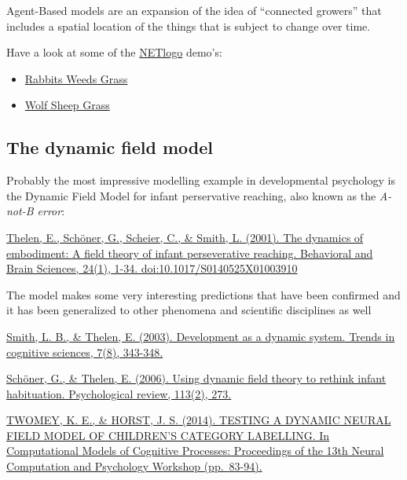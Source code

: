 \documentclass[12pt,]{book}
\providecommand{\tightlist}{%
  \setlength{\itemsep}{0pt}\setlength{\parskip}{0pt}}
\begin{document}
Agent-Based models are an expansion of the idea of ``connected growers'' that includes a spatial location of the things that is subject to change over time.

Have a look at some of the \href{http://ccl.northwestern.edu/netlogo/}{NETlogo} demo's:

\begin{itemize}
\tightlist
\item
  \href{http://www.netlogoweb.org/launch\#http://www.netlogoweb.org/assets/modelslib/Sample\%20Models/Biology/Rabbits\%20Grass\%20Weeds.nlogo}{Rabbits Weeds Grass}
\item
  \href{http://www.netlogoweb.org/launch\#http://www.netlogoweb.org/assets/modelslib/Sample\%20Models/Biology/Wolf\%20Sheep\%20Predation.nlogo}{Wolf Sheep Grass}
\end{itemize}

\hypertarget{the-dynamic-field-model}{%
\subsection{The dynamic field model}\label{the-dynamic-field-model}}

Probably the most impressive modelling example in developmental psychology is the Dynamic Field Model for infant perservative reaching, also known as the \emph{A-not-B error}:

\href{https://www.cambridge.org/core/journals/behavioral-and-brain-sciences/article/dynamics-of-embodiment-a-field-theory-of-infant-perseverative-reaching/1C2802AA1C508444DD6D3C3289141CD8\#}{Thelen, E., Schöner, G., Scheier, C., \& Smith, L. (2001). The dynamics of embodiment: A field theory of infant perseverative reaching. Behavioral and Brain Sciences, 24(1), 1-34. doi:10.1017/S0140525X01003910}

The model makes some very interesting predictions that have been confirmed and it has been generalized to other phenomena and scientific disciplines as well

\href{https://www.sciencedirect.com/science/article/pii/S1364661303001566}{Smith, L. B., \& Thelen, E. (2003). Development as a dynamic system. Trends in cognitive sciences, 7(8), 343-348.}

\href{https://www.scribd.com/document/119411540/Using-Dynamic-Field-Theory-to-Rethink-Infant-Habituation}{Schöner, G., \& Thelen, E. (2006). Using dynamic field theory to rethink infant habituation. Psychological review, 113(2), 273.}

\href{http://eprints.lancs.ac.uk/71113/1/Proceedings_final.pdf}{TWOMEY, K. E., \& HORST, J. S. (2014). TESTING A DYNAMIC NEURAL FIELD MODEL OF CHILDREN'S CATEGORY LABELLING. In Computational Models of Cognitive Processes: Proceedings of the 13th Neural Computation and Psychology Workshop (pp.~83-94).}
\end{document}
